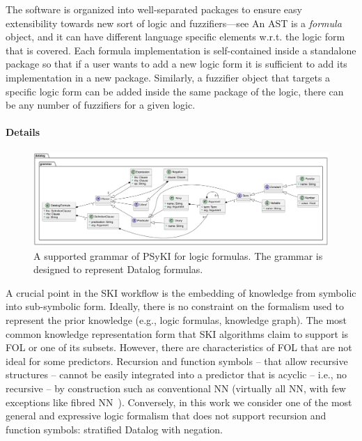The software is organized into well-separated packages to ensure easy extensibility towards new sort of logic and fuzzifiers---see 
%
An \gls{AST} is a \emph{formula} object, and it can have different language specific elements w.r.t. the logic form that is covered.
%
Each formula implementation is self-contained inside a standalone package so that if a user wants to add a new logic form it is sufficient to add its implementation in a new package.
%
Similarly, a fuzzifier object that targets a specific logic form can be added inside the same package of the logic, there can be any number of fuzzifiers for a given logic.


\paragraph{Details}\label{par:details}
%
\begin{figure}
    \centering
    \includegraphics[width=\textwidth]{figures/grammar}
    \caption[Class diagram for the representation of Datalog formulas]{
        A supported grammar of \Gls{PSyKI} for logic formulas.
        The grammar is designed to represent Datalog formulas.
    }
    \label{fig:grammar}
\end{figure}
%
A crucial point in the \gls{SKI} workflow is the embedding of knowledge from symbolic into sub-symbolic form.
%
Ideally, there is no constraint on the formalism used to represent the prior knowledge (e.g., logic formulas, knowledge graph).
%
The most common knowledge representation form that \gls{SKI} algorithms claim to support is \gls{FOL} or one of its subsets.
%
However, there are characteristics of \gls{FOL} that are not ideal for some predictors.
%
Recursion and function symbols -- that allow recursive structures -- cannot be easily integrated into a predictor that is acyclic -- i.e., no recursive -- by construction such as conventional \gls{NN} (virtually all \gls{NN}, with few exceptions like fibred \gls{NN}~\cite{DBLP:conf/flairs/BaderGH05}).
%
Conversely, in this work we consider one of the most general and expressive logic formalism that does not support recursion and function symbols: stratified Datalog with negation.


